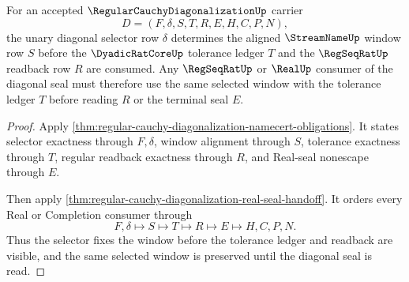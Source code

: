 \begin{theorem}
\label{thm:regular-cauchy-diagonalization-selector-window-exactness}
For an accepted $\RegularCauchyDiagonalizationUp$ carrier
$$
D=(F,\delta,S,T,R,E,H,C,P,N),
$$
the unary diagonal selector row $\delta$ determines the aligned $\StreamNameUp$ window row $S$ before the $\DyadicRatCoreUp$ tolerance ledger $T$ and the $\RegSeqRatUp$ readback row $R$ are consumed. Any $\RegSeqRatUp$ or $\RealUp$ consumer of the diagonal seal must therefore use the same selected window with the tolerance ledger $T$ before reading $R$ or the terminal seal $E$.
\end{theorem}
\begin{proof}
Apply \autoref{thm:regular-cauchy-diagonalization-namecert-obligations}. It states selector exactness through $F,\delta$, window alignment through $S$, tolerance exactness through $T$, regular readback exactness through $R$, and Real-seal nonescape through $E$.

Then apply \autoref{thm:regular-cauchy-diagonalization-real-seal-handoff}. It orders every Real or Completion consumer through
$$
F,\delta \longmapsto S \longmapsto T \longmapsto R \longmapsto E \longmapsto H,C,P,N .
$$
Thus the selector fixes the window before the tolerance ledger and readback are visible, and the same selected window is preserved until the diagonal seal is read.
\end{proof}

